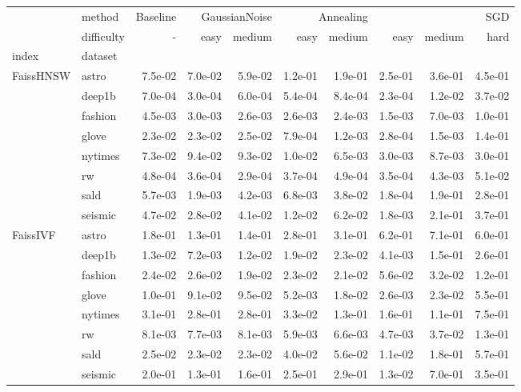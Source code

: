 \begin{tabular}{llrrrrrrrr}
\toprule
 & method & Baseline & \multicolumn{2}{r}{GaussianNoise} & \multicolumn{2}{r}{Annealing} & \multicolumn{3}{r}{SGD} \\
 & difficulty & - & easy & medium & easy & medium & easy & medium & hard \\
index & dataset &  &  &  &  &  &  &  &  \\
\midrule
\multirow[t]{8}{*}{FaissHNSW} & astro & 7.5e-02 & 7.0e-02 & 5.9e-02 & 1.2e-01 & 1.9e-01 & 2.5e-01 & 3.6e-01 & 4.5e-01 \\
 & deep1b & 7.0e-04 & 3.0e-04 & 6.0e-04 & 5.4e-04 & 8.4e-04 & 2.3e-04 & 1.2e-02 & 3.7e-02 \\
 & fashion & 4.5e-03 & 3.0e-03 & 2.6e-03 & 2.6e-03 & 2.4e-03 & 1.5e-03 & 7.0e-03 & 1.0e-01 \\
 & glove & 2.3e-02 & 2.3e-02 & 2.5e-02 & 7.9e-04 & 1.2e-03 & 2.8e-04 & 1.5e-03 & 1.4e-01 \\
 & nytimes & 7.3e-02 & 9.4e-02 & 9.3e-02 & 1.0e-02 & 6.5e-03 & 3.0e-03 & 8.7e-03 & 3.0e-01 \\
 & rw & 4.8e-04 & 3.6e-04 & 2.9e-04 & 3.7e-04 & 4.9e-04 & 3.5e-04 & 4.3e-03 & 5.1e-02 \\
 & sald & 5.7e-03 & 1.9e-03 & 4.2e-03 & 6.8e-03 & 3.8e-02 & 1.8e-04 & 1.9e-01 & 2.8e-01 \\
 & seismic & 4.7e-02 & 2.8e-02 & 4.1e-02 & 1.2e-02 & 6.2e-02 & 1.8e-03 & 2.1e-01 & 3.7e-01 \\
\cline{1-10}
\multirow[t]{8}{*}{FaissIVF} & astro & 1.8e-01 & 1.3e-01 & 1.4e-01 & 2.8e-01 & 3.1e-01 & 6.2e-01 & 7.1e-01 & 6.0e-01 \\
 & deep1b & 1.3e-02 & 7.2e-03 & 1.2e-02 & 1.9e-02 & 2.3e-02 & 4.1e-03 & 1.5e-01 & 2.6e-01 \\
 & fashion & 2.4e-02 & 2.6e-02 & 1.9e-02 & 2.3e-02 & 2.1e-02 & 5.6e-02 & 3.2e-02 & 1.2e-01 \\
 & glove & 1.0e-01 & 9.1e-02 & 9.5e-02 & 5.2e-03 & 1.8e-02 & 2.6e-03 & 2.3e-02 & 5.5e-01 \\
 & nytimes & 3.1e-01 & 2.8e-01 & 2.8e-01 & 3.3e-02 & 1.3e-01 & 1.6e-01 & 1.1e-01 & 7.5e-01 \\
 & rw & 8.1e-03 & 7.7e-03 & 8.1e-03 & 5.9e-03 & 6.6e-03 & 4.7e-03 & 3.7e-02 & 1.3e-01 \\
 & sald & 2.5e-02 & 2.3e-02 & 2.3e-02 & 4.0e-02 & 5.6e-02 & 1.1e-02 & 1.8e-01 & 5.7e-01 \\
 & seismic & 2.0e-01 & 1.3e-01 & 1.6e-01 & 2.5e-01 & 2.9e-01 & 1.3e-02 & 7.0e-01 & 3.5e-01 \\

\end{tabular}
